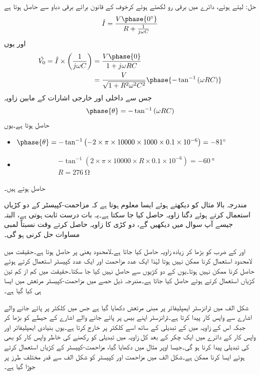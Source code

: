 حل:
 لیتے ہوئے، دائرے میں برقی رو  لکھتے ہوئے کرخوف کے قانون برائے برقی دباو سے حاصل ہوتا ہے
\begin{align*}
\hat{I}=\frac{V \phase{\SI{0}{\degree}}}{R+\frac{1}{j\omega C}}
\end{align*}
اور یوں
\begin{align*}
\hat{V_0}= \hat{I} \times \left(\frac{1}{j\omega C} \right)&=\frac{V\phase{0}}{1+j \omega R C}\\
&=\frac{V}{\sqrt{1+R^2 \omega^2 C^2}} \phase{-\tan^{-1} \left(\omega R C \right)}
\end{align*}
جس سے داخلی اور خارجی اشارات کے مابین زاویہ
\begin{align*}
\phase{\theta}=-\tan^{-1} \left(\omega R C \right) 
\end{align*}
حاصل ہوتا ہے۔یوں
\begin{itemize}
\item
$\phase{\theta}=-\tan^{-1} \left(-2 \times \pi \times 10000\times 1000 \times 0.1 \times 10^{-6} \right)=\SI{-81}{\degree} $
\item
\begin{align*}
-\tan^{-1}\left(2 \times \pi \times 10000 \times R \times 0.1 \times 10^{-6}\right)=\SI{-60}{\degree}\\
R=\SI{276}{\ohm}
\end{align*}
\end{itemize}
حاصل ہوتے ہیں۔

مندرجہ بالا مثال کو دیکھتے ہوئے ایسا معلوم ہوتا ہے کہ مزاحمت-کپیسٹر کے دو کڑیاں استعمال کرتے ہوئے دگنا زاویہ حاصل کیا جا سکتا ہے۔یہ بات درست ثابت ہوتی ہے، البتہ جیسے آپ سوال  میں دیکھیں گے، دو کڑی  کا زاویہ حاصل کرتے وقت نسبتاً لمبی مساوات حل کرنی ہو گی۔

 اور  کے ضرب  کو بڑھا کر زیادہ زاویہ حاصل کیا جاتا ہے۔لامحدود  یعنی پر  حاصل ہوتا ہے۔حقیقت میں لامحدود  استعمال کرنا ممکن نہیں ہوتا لہٰذا ایک عدد مزاحمت اور ایک عدد کپیسٹر استعمال کرتے ہوئے  حاصل کرنا ممکن نہیں ہوتا۔یوں  کے دو کڑیوں سے  حاصل نہیں کیا جا سکتا۔حقیقت میں کم از کم تین  کڑیاں استعمال کرتے ہوئے  حاصل کیا جاتا ہے۔مندرجہ ذیل حصے میں مزاحمت-کپیسٹر مرتعش میں ایسا ہی کیا گیا ہے۔  


شکل  الف میں ٹرانزسٹر ایمپلیفائر پر مبنی مرتعش دکھایا گیا ہے جس میں کلکٹر پر پائے جانے والے اشارے  سے واپس کار   پیدا کرتا ہے۔ٹرانزسٹر اپنے  بیس پر پائے جانے والے اشارے کے حیطے کو بڑھا کر جبکہ اس کے زاویہ میں   کے تبدیلی کے ساتھ اسے کلکٹر پر خارج کرتا ہے۔یوں بنیادی ایمپلیفائر اور واپس کار کے دائرے میں ایک چکر کے بعد کل زاویہ میں تبدیلی کو  رکھنے کی خاطر واپس کار کو بھی  کی تبدیلی پیدا کرنا ہو گی۔جیسا اوپر مثال میں دکھایا گیا، مزاحمت-کپیسٹر  کے کڑیاں استعمال کرتے ہوئے ایسا کرنا ممکن ہے۔شکل  الف میں مزاحمت اور کپیسٹر کو  شکل  الف سے قدر مختلف طرز پر جوڑا گیا ہے۔ 

